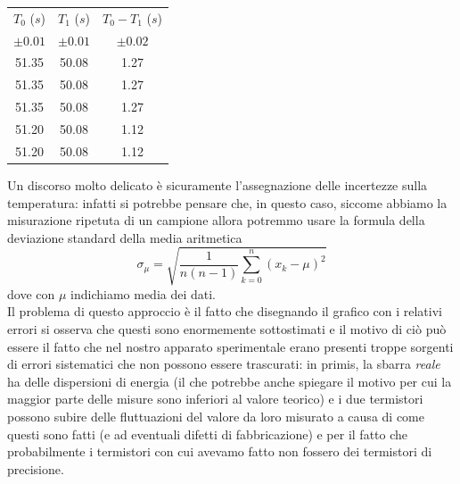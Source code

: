 \documentclass{article}
\begin{document}
\begin{table}
	\centering	
	\begin{tabular}{c c c} \toprule
		$T_0$ ($s$) & $T_1$ ($s$) & $T_0 - T_1$ ($s$) \\
		$\pm 0.01$ & $\pm 0.01$   & $\pm 0.02$ \\ \toprule
		51.35 &  50.08 &  1.27 \\ \midrule
		51.35 &  50.08 &  1.27 \\ \midrule
		51.35 &  50.08 &  1.27 \\ \midrule
		51.20 &  50.08 &  1.12 \\ \midrule
		51.20 &  50.08 &  1.12 \\ \bottomrule
	\end{tabular}
\end{table}

\noindent Un discorso molto delicato è sicuramente l'assegnazione delle incertezze sulla temperatura: infatti si potrebbe pensare che, in questo caso, siccome abbiamo la misurazione ripetuta di un campione allora potremmo usare la formula della deviazione standard della media aritmetica
\begin{equation}
	\sigma_\mu = \sqrt{\frac{1}{n(n-1)} \sum_{k = 0}^{n} (x_k - \mu)^2}
\end{equation}
dove con $\mu$ indichiamo media dei dati. \\
Il problema di questo approccio è il fatto che disegnando il grafico con i relativi errori si osserva che questi sono enormemente sottostimati e il motivo di ciò può essere il fatto che nel nostro apparato sperimentale erano presenti troppe sorgenti di errori sistematici che non possono essere trascurati: in primis, la sbarra \emph{reale} ha delle dispersioni di energia (il che potrebbe anche spiegare il motivo per cui la maggior parte delle misure sono inferiori al valore teorico) e i due termistori possono subire delle fluttuazioni del valore da loro misurato a causa di come questi sono fatti (e ad eventuali difetti di fabbricazione) e per il fatto che probabilmente i termistori con cui avevamo fatto non fossero dei termistori di precisione.
\end{document}
